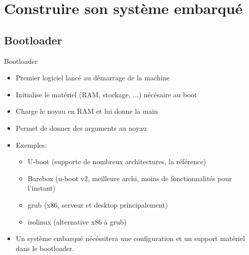 \section{Construire son système embarqué}

\subsection{Bootloader}
\begin{frame}{Bootloader}{}
  \begin{itemize}
  \item Premier logiciel lancé au démarrage de la machine
  \item Initialise le matériel (RAM, stockage, ...) nécésaire au boot
  \item Charge le noyau en RAM et lui donne la main
  \item Permet de donner des arguments au noyau
  \item Exemples:
    \begin{itemize}
    \item U-boot (supporte de nombreux architectures, la référence)
    \item Barebox (u-boot v2, meilleure archi, moins de fonctionnalités pour l'instant)
    \item grub (x86, serveur et desktop principalement)
    \item isolinux (alternative x86 à grub)
    \end{itemize}
  \item Un système embarqué nécéssitera une configuration et un support matériel dans le bootloader.
  \end{itemize}
\end{frame}

